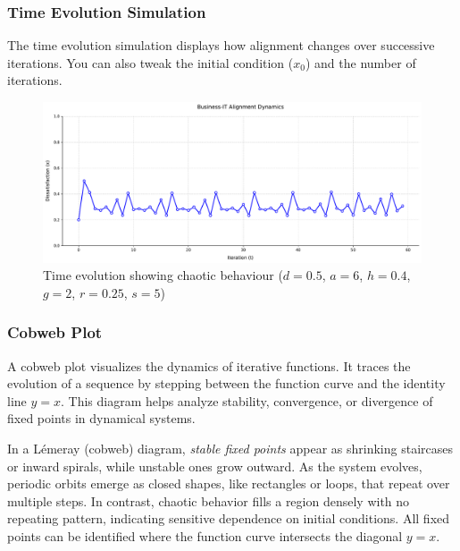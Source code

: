 \documentclass[a4paper, 10pt]{article}
\begin{document}
\subsubsection{Time Evolution Simulation}
The time evolution simulation displays how alignment changes over successive iterations.
You can also tweak the initial condition ($x_0$) and the number of iterations. 

\begin{figure}[h]
	\centering
	\includegraphics[width=1\textwidth]{../images/results/time-evolution.pdf}
	\caption{Time evolution showing chaotic behaviour ($d = 0.5$, $a = 6$, $h = 0.4$, $g = 2$, $r = 0.25$, $s = 5$)}
	\label{fig:time_sim}
\end{figure}

\subsubsection{Cobweb Plot}
A cobweb plot visualizes the dynamics of iterative functions. 
It traces the evolution of a sequence by stepping between the function curve and the identity line $y = x$. This diagram helps analyze stability, convergence, or divergence of fixed points in dynamical systems. 

In a Lémeray (cobweb) diagram, \textit{stable fixed points} appear as shrinking staircases or inward spirals, while unstable ones grow outward.
As the system evolves, periodic orbits emerge as closed shapes, like rectangles or loops, that repeat over multiple steps.
In contrast, chaotic behavior fills a region densely with no repeating pattern, indicating sensitive dependence on initial conditions.
All fixed points can be identified where the function curve intersects the diagonal $y = x$.
\end{document}
